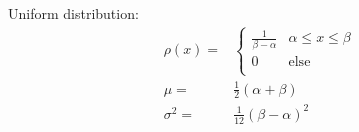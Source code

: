 			\noindent
			Uniform distribution:
			\begin{equation}
				\begin{aligned}
					\rho(x) =& \left\{\begin{array}{ll}
						\frac{1}{\beta-\alpha} & \alpha\le x\le \beta \\
						0                      & \text{else}          \\
					\end{array}\right. \\
					\mu =& \frac{1}{2}(\alpha+\beta) \\
					\sigma^2 =& \frac{1}{12}(\beta-\alpha)^2 \\
				\end{aligned}
			\end{equation}
